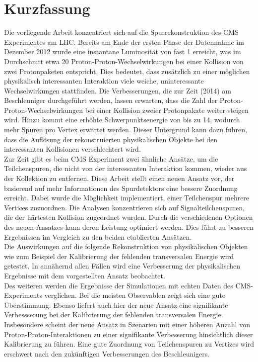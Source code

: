 
\chapter*{Kurzfassung}

Die vorliegende Arbeit konzentriert sich auf die Spurrekonstruktion des CMS Experimentes am LHC. Bereits am Ende der ersten Phase der Datennahme im Dezember 2012 wurde  eine instantane Luminosit\"a{}t von fast 1\percms{} erreicht, was im Durchschnitt etwa 20 Proton-Proton-Wechselwirkungen bei einer Kollision von zwei Protonpaketen entspricht. Dies bedeutet, dass zus\"a{}tzlich zu einer m\"o{}glichen physikalisch interessanten Interaktion viele weiche, uninteressante Wechselwirkungen stattfinden. Die Verbesserungen, die zur Zeit (2014) am Beschleuniger durchgef\"u{}hrt werden, lassen erwarten, dass die Zahl der Proton-Proton-Wechselwirkungen bei einer Kollision zweier Protonpakate weiter steigen wird. Hinzu kommt eine erh\"o{}hte Schwerpunktsenergie von bis zu 14\TeV{}, wodurch mehr Spuren pro Vertex erwartet werden. Dieser Untergrund kann dazu f\"u{}hren, dass die Aufl\"o{}sung der rekonstruierten physikalischen Objekte bei den interessanten Kollisionen verschlechtert wird. \\
Zur Zeit gibt es beim CMS Experiment zwei \"a{}hnliche Ans\"a{}tze, um die Teilchenspuren, die nicht von der interessanten Interaktion kommen, wieder aus der Kollektion zu entfernen. Diese Arbeit stellt einen neuen Ansatz vor, der basierend auf mehr Informationen des Spurdetektors eine bessere Zuordnung erreicht. Dabei wurde die M\"o{}glichkeit implementiert, einer Teilchenspur mehrere Vertices zuzuordnen. Die Analysen konzentrieren sich auf Signalteilchenspuren, die der h\"a{}rtesten Kollision zugeordnet wurden. Durch die verschiedenen Optionen des neuen Ansatzes kann deren Leistung optimiert werden. Dies f\"u{}hrt zu besseren Ergebnissen im Vergleich zu den beiden etablierten Ans\"a{}tzen. \\
Die Auswirkungen auf die folgende Rekonstruktion von physikalischen Objekten wie zum Beispiel der Kalibrierung der fehlenden transversalen Energie wird getestet. In ann\"a{}hernd allen F\"a{}llen wird eine Verbesserung der physikalischen Ergebnisse mit dem vorgestellten Ansatz beobachtet. \\
Des weiteren werden die Ergebnisse der Simulationen mit echten Daten des CMS-Experiments verglichen. Bei die meisten Observablen zeigt sich eine gute \"U{}berstimmung. Ebenso liefert auch hier der neue Ansatz eine signifikante Verbessserung bei der Kalibrierung der fehlenden transversalen Energie. Insbesondere scheint der neue Ansatz in Szenarien mit einer h\"o{}heren Anzahl von Proton-Proton-Interaktionen zu einer signifikante Verbesserung hinsichtlich dieser Kalibrierung zu f\"u{}hren. Eine gute Zuordnung von Teilchenspuren zu Vertizes wird erschwert nach den zuk\"u{}nftigen Verbesserungen des Beschleunigers.

